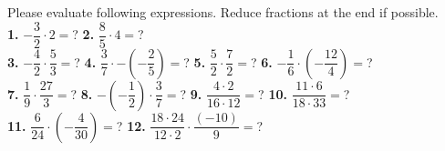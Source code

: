\documentclass[a4paper]{article}
\begin{document}
\begin{Large}

Please evaluate following expressions. Reduce fractions at the end if possible. \\[0.75cm]
		
\textbf{1.} $- \dfrac{3}{2} \cdot 2 =$? \hspace{0.2cm}
\textbf{2.} $\dfrac{8}{5} \cdot 4 =$? \\[0.75cm]
\textbf{3.} $- \dfrac{4}{2} \cdot \dfrac{5}{3} =$? \hspace{0.2cm}
\textbf{4.} $\dfrac{3}{7} \cdot - (-\dfrac{2}{5}) =$? \hspace{0.2cm}
\textbf{5.} $\dfrac{5}{2} \cdot \dfrac{7}{2} =$? \hspace{0.2cm}
\textbf{6.} $- \dfrac{1}{6} \cdot (- \dfrac{12}{4}) =$? \\[0.75cm]
\textbf{7.} $\dfrac{1}{9} \cdot \dfrac{27}{3} =$? \hspace{0.2cm}
\textbf{8.} $- (-\dfrac{1}{2}) \cdot \dfrac{3}{7} =$? \hspace{0.2cm}
\textbf{9.} $\dfrac{4 \cdot 2}{16 \cdot 12}=$? \hspace{0.2cm}
\textbf{10.} $\dfrac{11 \cdot 6}{18 \cdot 33}=$? \\[0.75cm]
\textbf{11.} $\dfrac{6}{24} \cdot (- \dfrac{4}{30}) =$? \hspace{0.2cm}
\textbf{12.} $\dfrac{18 \cdot 24}{12 \cdot 2} \cdot \dfrac{(-10)}{9} =$? \hspace{0.2cm}

\end{Large}
\end{document}
